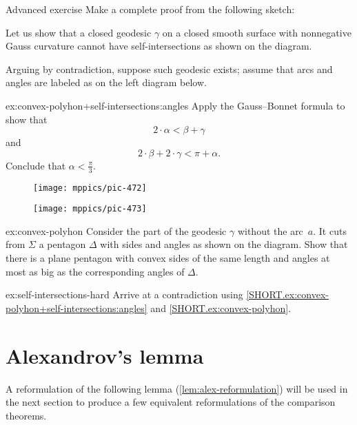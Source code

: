 \begin{thm}{Advanced exercise}\label{ex:convex-polyhon+self-intersections}
Make a complete proof from the following sketch:

Let us show that a closed geodesic $\gamma$ on a closed smooth surface with nonnegative Gauss curvature cannot have self-intersections as shown on the diagram.

Arguing by contradiction, suppose such geodesic exists;
assume that arcs and angles are labeled as on the left diagram below.

\begin{subthm}{ex:convex-polyhon+self-intersections:angles}
Apply the Gauss--Bonnet formula to show that
\[2\cdot\alpha<\beta+\gamma\]
and 
\[2\cdot\beta+2\cdot \gamma<\pi+\alpha.\]
Conclude that $\alpha <\tfrac \pi 3$.
\end{subthm}

\begin{figure}[!ht]
\begin{minipage}{.38\textwidth}
\centering
\texttt{[image: mppics/pic-472]}
\end{minipage}\hfill
\begin{minipage}{.58\textwidth}
\centering
\texttt{[image: mppics/pic-473]}
\end{minipage}
\end{figure}

\begin{subthm}{ex:convex-polyhon}
Consider the part of the geodesic $\gamma$ without the arc~$a$.
It cuts from $\Sigma$ a pentagon $\Delta$ with sides and angles as shown on the diagram. 
Show that there is a plane pentagon with convex sides of the same length and angles at most as big as the corresponding angles of $\Delta$.
\end{subthm}

\begin{subthm}{ex:self-intersections-hard}
Arrive at a contradiction using \ref{SHORT.ex:convex-polyhon+self-intersections:angles} and \ref{SHORT.ex:convex-polyhon}. 
\end{subthm}

\end{thm}

\section{Alexandrov's lemma}

A reformulation of the following lemma (\ref{lem:alex-reformulation}) will be used in the next section to produce a few equivalent reformulations of the comparison theorems.

